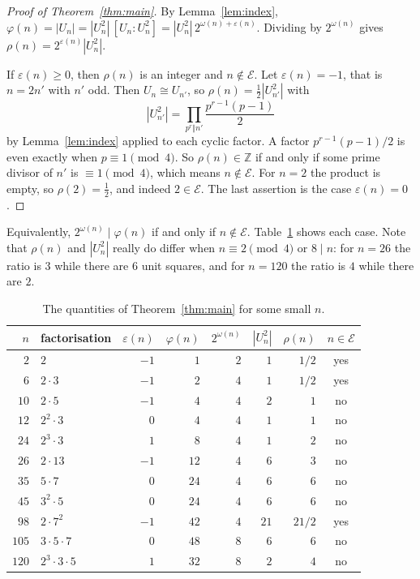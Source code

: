 \documentclass[11pt]{article}
\theoremstyle{definition}
\newcommand{\Z}{\mathbb{Z}}
\newcommand{\E}{\mathcal{E}}
\renewcommand{\phi}{\varphi}
\renewcommand{\epsilon}{\varepsilon}
\begin{document}
\begin{proof}[Proof of Theorem~\ref{thm:main}]
By Lemma~\ref{lem:index}, $\phi(n)=|U_n|=|U_n^2|\,[U_n:U_n^2]=|U_n^2|\,2^{\omega(n)+\epsilon(n)}$. Dividing by $2^{\omega(n)}$ gives $\rho(n)=2^{\epsilon(n)}|U_n^2|$.

If $\epsilon(n)\ge0$, then $\rho(n)$ is an integer and $n\notin\E$. Let $\epsilon(n)=-1$, that is $n=2n'$ with $n'$ odd. Then $U_n\cong U_{n'}$, so $\rho(n)=\tfrac12|U_{n'}^2|$ with
\[
  |U_{n'}^2|=\prod_{p^r\Vert n'}\frac{p^{r-1}(p-1)}{2}
\]
by Lemma~\ref{lem:index} applied to each cyclic factor. A factor $p^{r-1}(p-1)/2$ is even exactly when $p\equiv1\pmod4$. So $\rho(n)\in\Z$ if and only if some prime divisor of $n'$ is $\equiv1\pmod4$, which means $n\notin\E$. For $n=2$ the product is empty, so $\rho(2)=\tfrac12$, and indeed $2\in\E$. The last assertion is the case $\epsilon(n)=0$.
\end{proof}

Equivalently, $2^{\omega(n)}\mid\phi(n)$ if and only if $n\notin\E$. Table~\ref{tab:small} shows each case. Note that $\rho(n)$ and $|U_n^2|$ really do differ when $n\equiv2\pmod4$ or $8\mid n$: for $n=26$ the ratio is $3$ while there are $6$ unit squares, and for $n=120$ the ratio is $4$ while there are $2$.

\begin{table}[htbp]
\centering
\caption{The quantities of Theorem~\ref{thm:main} for some small $n$.}
\label{tab:small}
\small
\begin{tabular}{rlrrrrrc}
\toprule
$n$ & factorisation & $\epsilon(n)$ & $\phi(n)$ & $2^{\omega(n)}$ & $|U_n^2|$ & $\rho(n)$ & $n\in\E$\\
\midrule
$2$ & $2$ & $-1$ & $1$ & $2$ & $1$ & $1/2$ & yes \\
$6$ & $2\cdot 3$ & $-1$ & $2$ & $4$ & $1$ & $1/2$ & yes \\
$10$ & $2\cdot 5$ & $-1$ & $4$ & $4$ & $2$ & $1$ & no \\
$12$ & $2^{2}\cdot 3$ & $0$ & $4$ & $4$ & $1$ & $1$ & no \\
$24$ & $2^{3}\cdot 3$ & $1$ & $8$ & $4$ & $1$ & $2$ & no \\
$26$ & $2\cdot 13$ & $-1$ & $12$ & $4$ & $6$ & $3$ & no \\
$35$ & $5\cdot 7$ & $0$ & $24$ & $4$ & $6$ & $6$ & no \\
$45$ & $3^{2}\cdot 5$ & $0$ & $24$ & $4$ & $6$ & $6$ & no \\
$98$ & $2\cdot 7^{2}$ & $-1$ & $42$ & $4$ & $21$ & $21/2$ & yes \\
$105$ & $3\cdot 5\cdot 7$ & $0$ & $48$ & $8$ & $6$ & $6$ & no \\
$120$ & $2^{3}\cdot 3\cdot 5$ & $1$ & $32$ & $8$ & $2$ & $4$ & no \\
\bottomrule
\end{tabular}
\end{table}
\end{document}
